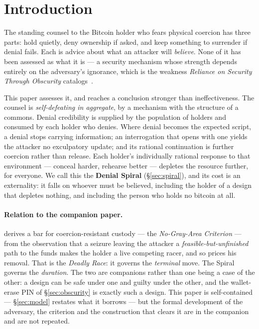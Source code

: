 \section{Introduction}
\label{sec:intro}

The standing counsel to the Bitcoin holder who fears physical coercion has three
parts: hold quietly, deny ownership if asked, and keep something to surrender if
denial fails. Each is advice about what an attacker will \emph{believe}. None of
it has been assessed as what it is --- a security mechanism whose strength
depends entirely on the adversary's ignorance, which is the weakness
\emph{Reliance on Security Through Obscurity} catalogs~\cite{cwe656}.

This paper assesses it, and reaches a conclusion stronger than ineffectiveness.
The counsel is \emph{self-defeating in aggregate}, by a mechanism with the
structure of a commons. Denial credibility is supplied by the population of
holders and consumed by each holder who denies. Where denial becomes the expected
script, a denial stops carrying information; an interrogation that opens with one
yields the attacker no exculpatory update; and its rational continuation is
further coercion rather than release. Each holder's individually rational
response to that environment --- conceal harder, rehearse better --- depletes the
resource further, for everyone. We call this the \textbf{Denial Spiral}
(\S\ref{sec:spiral}), and its cost is an externality: it falls on whoever must be
believed, including the holder of a design that depletes nothing, and including
the person who holds no bitcoin at all.

\paragraph{Relation to the companion paper.} \cite{deadly-race} derives a bar for
coercion-resistant custody --- the \emph{No-Gray-Area Criterion} --- from the
observation that a seizure leaving the attacker a \emph{feasible-but-unfinished}
path to the funds makes the holder a live competing racer, and so prices his
removal. That is the \emph{Deadly Race}: it governs the \emph{terminal} move. The
Spiral governs the \emph{duration}. The two are companions rather than one being
a case of the other: a design can be safe under one and guilty under the other,
and the wallet-erase PIN of \S\ref{sec:obscurity} is exactly such a design. This
paper is self-contained --- \S\ref{sec:model} restates what it borrows --- but
the formal development of the adversary, the criterion and the construction that
clears it are in the companion and are not repeated.

